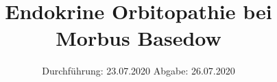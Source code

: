

\subject{TPS Praktikum}
\title{Endokrine Orbitopathie bei Morbus Basedow }
\date{%
  Durchführung: 23.07.2020  \hspace{3em}
  Abgabe: 26.07.2020
}



\maketitle
\thispagestyle{empty}
\tableofcontents
\newpage






\printbibliography{}



